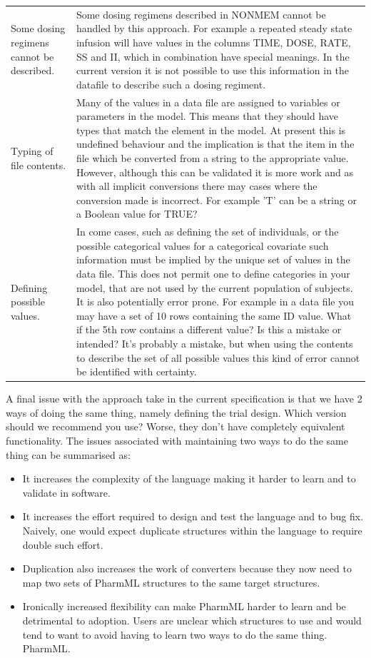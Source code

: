 \documentclass[a4paper,11pt]{article}
\newcommand{\pharmml}{PharmML\xspace}
\begin{document}
{\begin{longtable}{p{5cm} p{10cm}}
  Some dosing regimens cannot be described. &  Some dosing regimens
  described in NONMEM cannot be handled by this approach. For example
  a repeated steady state infusion will have values in the
  columns TIME, DOSE, RATE, SS and II, which in combination have
  special meanings. In the current version it is not possible to use this information in the
  datafile to describe such a dosing regiment.\\
Typing of file contents. & Many of the values in a data file are
assigned to variables or parameters in the model. This means that they
should have types that match the element in the model. At present this
is undefined behaviour and the implication is that the item in the
file which be converted from a string to the appropriate
value. However, although this can be validated it is more work and as
with all implicit conversions there may cases where the conversion
made is incorrect. For example 'T' can be a string or a Boolean value for TRUE?\\
Defining possible values. & In come cases, such as defining the set of
individuals, or the possible categorical values for a categorical
covariate such information must be implied by the unique set of values
in the data file. This does not permit one to define categories in
your model, that are not used by the current population of
subjects. It is also potentially error prone. For example in a data
file you may have a set of 10 rows containing the same ID value. What
if the 5th row contains a different value? Is this a mistake or
intended? It's probably a mistake, but when using the contents to
describe the set of all possible values this kind of error cannot be
identified with certainty.\\
\bottomrule
\end{longtable}%
}
A final issue with the approach take in the current specification is
that we have 2 ways of doing the same thing, namely defining the trial
design. Which version should we recommend you use? Worse, they don't
have completely equivalent functionality. The issues associated with
maintaining two ways to do the same thing can be summarised as:
\begin{itemize}
\item It increases the complexity of the language making it harder to
  learn and to validate in software.
\item It increases the effort required to design and test the
  language and to bug fix. Naively, one would expect duplicate structures within the
  language to require double such effort.
\item Duplication also increases the work of converters because they
  now need to map two sets of \pharmml structures to the same target structures.
\item Ironically increased flexibility can make \pharmml harder to
  learn and be detrimental to adoption. Users are unclear which
  structures to use and would tend to want to avoid having to learn
  two ways to do the same thing.
\pharmml. 
\end{itemize}
\end{document}
